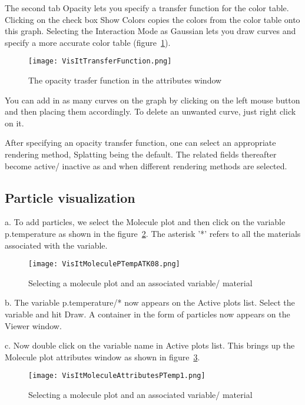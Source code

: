 The second tab Opacity lets you specify a transfer function for the color table. Clicking on the check box Show Colors copies the colors from the color table onto this graph. Selecting the Interaction Mode as Gaussian lets you draw curves and specify a more accurate color table (figure~\ref{VisItTransferFunction}).

\begin{figure}
  \center
  \texttt{[image: VisItTransferFunction.png]}
  \caption{The opacity trasfer function in the attributes window}
  \label{VisItTransferFunction}
\end{figure}

You can add in as many curves on the graph by clicking on the left mouse button and then placing them accordingly. To delete an unwanted curve, just right click on it.

After specifying an opacity transfer function, one can select an appropriate rendering method, Splatting being the default. The related fields thereafter become active/ inactive as and when different rendering methods are selected.

\subsection{Particle visualization}

a. To add particles, we select the Molecule plot and then click on the variable p.temperature as shown in the figure~\ref{VisItMoleculePTempATK08}. The asterisk '*' refers to all the materials associated with the variable.

\begin{figure}
  \center
  \texttt{[image: VisItMoleculePTempATK08.png]}
  \caption{Selecting a molecule plot and an associated variable/ material}
  \label{VisItMoleculePTempATK08}
\end{figure}

b. The variable p.temperature/* now appears on the Active plots list. Select the variable and hit Draw. A container in the form of particles now appears on the Viewer window.

c. Now double click on the variable name in Active plots list. This brings up the Molecule plot attributes window as shown in figure~\ref{VisItMoleculeAttributesPTemp1}.

\begin{figure}
  \center
  \texttt{[image: VisItMoleculeAttributesPTemp1.png]}
  \caption{Selecting a molecule plot and an associated variable/ material}
  \label{VisItMoleculeAttributesPTemp1}
\end{figure}

